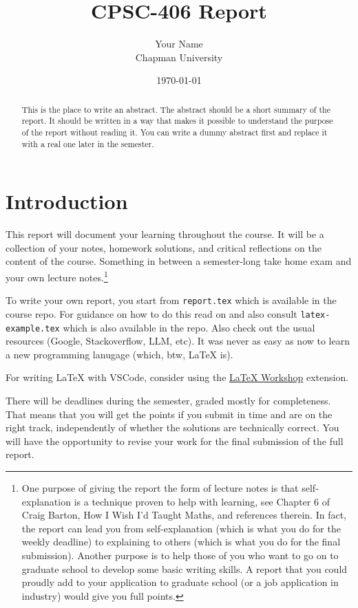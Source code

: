 \documentclass{article}
\title{CPSC-406 Report}
\author{Your Name  \\ Chapman University}
\date{\today}
\theoremstyle{theorem}
\theoremstyle{definition}
\theoremstyle{remark}
\begin{document}
\maketitle

\begin{abstract}
This is the place to write an abstract. The abstract should be a short summary of the report. It should be written in a way that makes it possible to understand the purpose of the report without reading it. You can write a dummy abstract first and replace it with a real one later in the semester.
\end{abstract}

\setcounter{tocdepth}{3}
\tableofcontents

\section{Introduction}\label{intro}

This report will document your learning throughout the course. It will be a collection of your notes, homework solutions, and critical reflections on the content of the course. Something in between a semester-long take home exam and your own lecture notes.\footnote{One purpose of giving the report the form of lecture notes is that self-explanation is a technique proven to help with learning, see Chapter 6 of Craig Barton, How I Wish I'd Taught Maths, and references therein. In fact, the report can lead you from self-explanation (which is what you do for the weekly deadline) to explaining to others (which is what you do for the final submission). Another purpose is to help those of you who want to go on to graduate school to develop some basic writing skills. A report that you could proudly add to your application to graduate school (or a job application in industry) would give you full points.}

To write your own report, you start from \texttt{report.tex} which is available in the course repo. For guidance on how to do this read on and also consult \texttt{latex-example.tex} which is also available in the repo. Also check out the usual resources (Google, Stackoverflow, LLM, etc). It was never as easy as now to learn a new programming lanugage (which, btw, \LaTeX{} is).

For writing \LaTeX{} with VSCode, consider using the \href{https://marketplace.visualstudio.com/items?itemName=James-Yu.latex-workshop}{\LaTeX{} Workshop} extension. 

There will be deadlines during the semester, graded mostly for completeness. That means that you will get the points if you submit in time and are on the right track, independently of whether the solutions are technically correct. You will have the opportunity to revise your work for the final submission of the full report.
\end{document}
